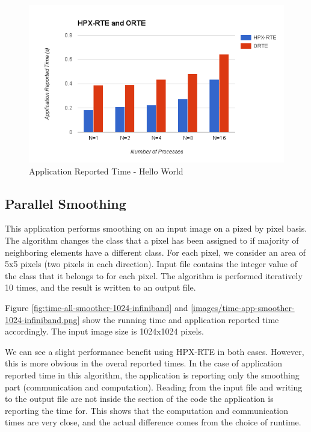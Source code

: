 \begin{figure}[h!]
\centering
\includegraphics[scale=0.7]{images/time-app-hello-world-infiniband.png}
\caption[Application Reported Time - Hello World]{Application Reported Time - Hello World}
\label{fig:time-app-hello-world-infiniband}
\end{figure}


\subsection{Parallel Smoothing}
This application performs smoothing on an input image on a pized by pixel basis. The algorithm changes the class that a pixel has been assigned to if majority of neighboring elements have a different class. For each pixel, we consider an area of 5x5 pixels (two pixels in each direction). Input file contains the integer value of the class that it belongs to for each pixel. The algorithm is performed iteratively 10 times, and the result is written to an output file.

Figure \ref{fig:time-all-smoother-1024-infiniband} and \ref{images/time-app-smoother-1024-infiniband.png} show the running time and application reported time accordingly. The input image size is 1024x1024 pixels.

We can see a slight performance benefit using HPX-RTE in both cases. However, this is more obvious in the overal reported times. In the case of application reported time in this algorithm, the application is reporting only the smoothing part (communication and computation). Reading from the input file and writing to the output file are not inside the section of the code the application is reporting the time for. This shows that the computation and communication times are very close, and the actual difference comes from the choice of runtime.

